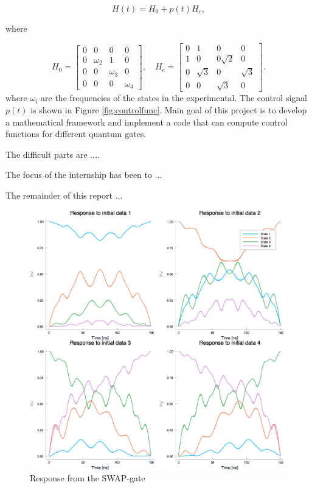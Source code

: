 \documentclass[11pt]{article}
\begin{document}
\begin{equation}
H(t)= H_0 + p(t)H_c, 
\end{equation}

where

\[
H_0 = 
\begin{bmatrix}
0 & 0 & 0 & 0 \\
0 & \omega_2 & 1 & 0 \\
0 & 0 & \omega_3 & 0 \\
0 & 0 & 0 & \omega_4
\end{bmatrix},
\quad
H_c =
\begin{bmatrix}
0 & 1 & 0 & 0 \\
1 & 0 & 0 \sqrt{2} & 0 \\
0 & \sqrt{3} & 0 & \sqrt{3} \\
0 & 0 & \sqrt{3} & 0
\end{bmatrix}.
\]
where {\color{red} $\omega_i$ are the frequencies of the states in the experimental}. The control signal $p(t)$ is shown in Figure \ref{fig:controlfunc}. Main goal of this project is to develop a mathematical framework and implement a code that can compute control functions for different quantum gates.
{\color{red} 
The difficult parts are ....

The focus of the internship has been to ...

The remainder of this report ...}


\begin{figure}
  \includegraphics[width=\linewidth]{response}
  \caption{Response from the SWAP-gate}
  \label{fig:responseSWAP}
\end{figure}
\end{document}
